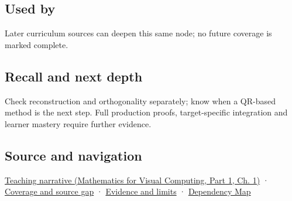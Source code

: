 \subsection{Used by}\label{appendix-c39f1ed34271-used-by}

\hypertarget{appendix-c39f1ed34271-used-by}{}

Later curriculum sources can deepen this same node; no future coverage is marked complete.

\subsection{Recall and next depth}\label{appendix-c39f1ed34271-recall-and-next-depth}

\hypertarget{appendix-c39f1ed34271-recall-and-next-depth}{}

Check reconstruction and orthogonality separately; know when a QR-based method is the next step. Full production proofs, target-specific integration and learner mastery require further evidence.

\subsection{Source and navigation}\label{appendix-c39f1ed34271-source-and-navigation}

\hypertarget{appendix-c39f1ed34271-source-and-navigation}{}

\href{../02-Mathematics-for-Visual-Computing-P01/main.pdf\#nameddest=01-foundations-i-ch017-orthonormal-frames-make-reconstruction-simple}{Teaching narrative (Mathematics for Visual Computing, Part 1, Ch. 1)} · \hyperref[appendix-fd090d982a15-phase-6---parts-501-600]{Coverage and source gap} · \hyperref[appendix-a103e7846d21-phase-6---source-analysis-and-verification]{Evidence and limits} · \hyperref[appendix-4ad47bdd269a]{Dependency Map}
